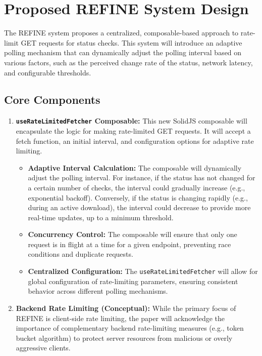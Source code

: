 \documentclass[10pt]{article}
\begin{document}
\section{Proposed REFINE System Design}

The REFINE system proposes a centralized, composable-based approach to rate-limit GET requests for status checks. This system will introduce an adaptive polling mechanism that can dynamically adjust the polling interval based on various factors, such as the perceived change rate of the status, network latency, and configurable thresholds.

\subsection{Core Components}

\begin{enumerate}
    \item \textbf{\texttt{useRateLimitedFetcher} Composable:} This new SolidJS composable will encapsulate the logic for making rate-limited GET requests. It will accept a fetch function, an initial interval, and configuration options for adaptive rate limiting.
    \begin{itemize}
        \item \textbf{Adaptive Interval Calculation:} The composable will dynamically adjust the polling interval. For instance, if the status has not changed for a certain number of checks, the interval could gradually increase (e.g., exponential backoff). Conversely, if the status is changing rapidly (e.g., during an active download), the interval could decrease to provide more real-time updates, up to a minimum threshold.
        \item \textbf{Concurrency Control:} The composable will ensure that only one request is in flight at a time for a given endpoint, preventing race conditions and duplicate requests.
        \item \textbf{Centralized Configuration:} The \texttt{useRateLimitedFetcher} will allow for global configuration of rate-limiting parameters, ensuring consistent behavior across different polling mechanisms.
    \end{itemize}
    \item \textbf{Backend Rate Limiting (Conceptual):} While the primary focus of REFINE is client-side rate limiting, the paper will acknowledge the importance of complementary backend rate-limiting measures (e.g., token bucket algorithm) to protect server resources from malicious or overly aggressive clients.
\end{enumerate}
\end{document}
